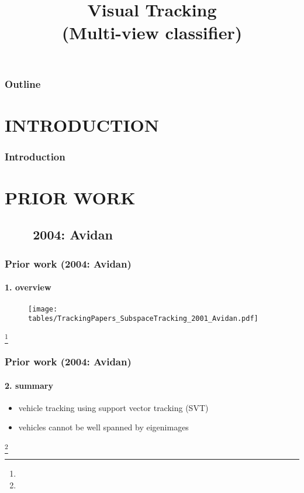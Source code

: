 
\title{Visual Tracking \\ (Multi-view classifier)}
\begin{frame}[plain]\logoTechTower
	\titlepage
\end{frame}

\begin{frame}
\frametitle{Outline}
\logoCSIPCPL\logoTechTower
	\setcounter{tocdepth}{1}	
	\tableofcontents
\end{frame}

\section{INTRODUCTION}
\begin{frame}
\frametitle{Introduction}
\framesubtitle{}
\logoCSIPCPL\mypagenum
\end{frame}

\section{PRIOR WORK}

\subsection{\ \ \ \ 2004: Avidan}
\begin{frame}
\frametitle{Prior work (2004: Avidan)}
\framesubtitle{1. overview}
\logoCSIPCPL\mypagenum
	\begin{figure}
		\texttt{[image: tables/TrackingPapers\_SubspaceTracking\_2001\_Avidan.pdf]}
	\end{figure}
\footnote{\tiny {}}
\end{frame}


\begin{frame}
\frametitle{Prior work (2004: Avidan)}
\framesubtitle{2. summary}
\logoCSIPCPL\mypagenum
	\begin{itemize}
		\item vehicle tracking using support vector tracking (SVT)
		\item vehicles cannot be well spanned by eigenimages
	\end{itemize}
\footnote{\tiny {}}
\end{frame}


